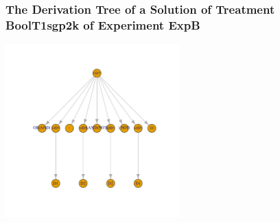  \begin{frame}
 \frametitle{ The Derivation Tree of a Solution of Treatment BoolT1sgp2k of Experiment ExpB }
 \begin{center}
\includegraphics[width=0.5\textwidth, angle=0]
{ExpBDerivationTreeFigure005.pdf}
 \end{center}
 \label{report/ExpBDerivationTreeFigure005.pdf}  
 \end{frame}

